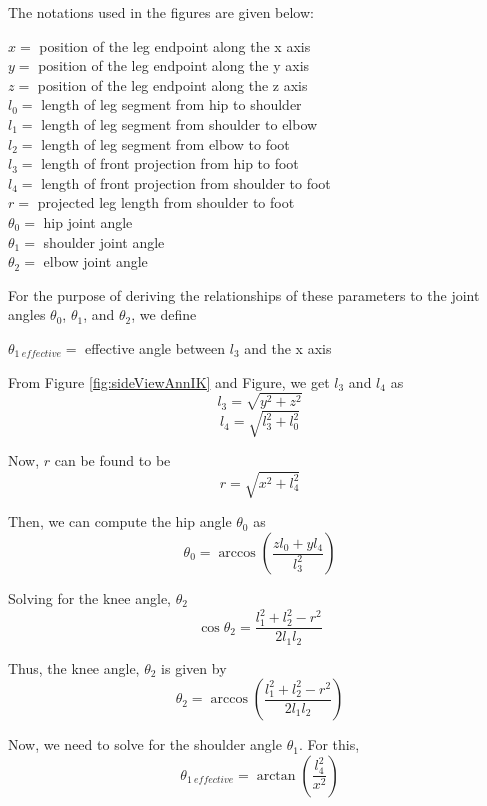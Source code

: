 The notations used in the figures are given below:

\begin{flushleft}
\(x = \) position of the leg endpoint along the x axis\\
\(y = \) position of the leg endpoint along the y axis\\
\(z = \) position of the leg endpoint along the z axis\\
\(l_0 = \) length of leg segment from hip to shoulder\\
\(l_1 = \) length of leg segment from shoulder to elbow\\
\(l_2 = \) length of leg segment from elbow to foot\\
\(l_3 = \) length of front projection from hip to foot\\
\(l_4 = \) length of front projection from shoulder to foot\\
\(r = \) projected leg length from shoulder to foot\\
\(\theta_0 = \) hip joint angle\\
\(\theta_1 = \) shoulder joint angle\\
\(\theta_2 = \) elbow joint angle\\

\end{flushleft}

For the purpose of deriving the relationships of these parameters to the joint angles \(\theta_0\), \(\theta_1\), and \(\theta_2\), we define

\begin{flushleft}
\(\theta_{1 \ effective} = \) effective angle between \(l_3\) and the x axis
\end{flushleft}

From Figure \ref{fig:sideViewAnnIK} and Figure, we get \(l_3\) and \(l_4\) as
\[l_3 = \sqrt{y^2 + z^2}\]
\[l_4 = \sqrt{l_3^2 + l_0^2}\]

Now, \(r\) can be found to be
\[r = \sqrt{x^2 + l_4^2}\]

Then, we can compute the hip angle \(\theta_0\) as
\[\theta_0 = \arccos{\left( \frac{z l_0 + y l_4}{l_3^2} \right)}\]

Solving for the knee angle, \(\theta_2\)
\[\cos{\theta_2} = \frac{l_1^2 + l_2^2 - r^2}{2 l_1 l_2}\]

Thus, the knee angle, \(\theta_2\) is given by
\[\theta_2 = \arccos{\left( \frac{l_1^2 + l_2^2 - r^2}{2 l_1 l_2} \right)}\]

Now, we need to solve for the shoulder angle \(\theta_1\). For this,
\[\theta_{1 \ effective} = \arctan{\left( \frac{l_4^2}{x^2} \right)}\]

